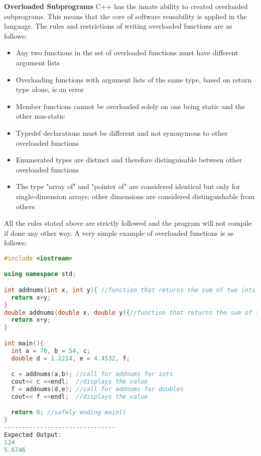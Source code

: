 \documentclass[12pt]{article}
\begin{document}
\textbf{Overloaded Subprograms} C++ has the innate ability to created overloaded subprograms. This means that the core of software reusability is applied in the language. The rules and restrictions of writing overloaded functions are as follows:
\begin{itemize}
  \item Any two functions in the set of overloaded functions must have different argument lists
  \item Overloading functions with argument lists of the same type, based on return type alone, is an error
  \item Member functions cannot be overloaded solely on one being static and the other non-static
  \item Typedef declarations must be different and not synonymous to other overloaded functions
  \item Enumerated types are distinct and therefore distinguisable between other overloaded functions
  \item The type "array of" and "pointer of" are considered identical but only for single-dimension arrays; other dimensions are considered distinguishable from others 
\end{itemize}

All the rules stated above are strictly followed and the program will not compile if done any other way. A very simple example of overloaded functions is as follows:
\begin{lstlisting}[language=C++]
  #include <iostream>

using namespace std;

int addnums(int x, int y){ //function that returns the sum of two ints
  return x+y;
}
double addnums(double x, double y){//function that returns the sum of two doubles
  return x+y;
}

int main(){
  int a = 70, b = 54, c;
  double d = 1.2214, e = 4.4532, f;

  c = addnums(a,b); //call for addnums for ints
  cout<< c <<endl;  //displays the value
  f = addnums(d,e); //call for addnums for doubles
  cout<< f <<endl;  //displays the value

  return 0; //safely ending main()
}
-------------------------------
Expected Output:
124
5.6746
\end{lstlisting}
\end{document}
